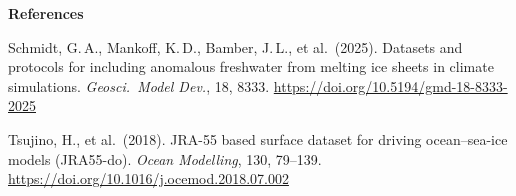 \documentclass{article}
\makeatletter
\def\pscale{2.12851}
\newlength\ph \setlength\ph{558.447mm}\setlength\ph{\pscale\ph}
\newcommand\tl[1]{\dimexpr\pscale\dimexpr#1mm\relax\relax} %
\newcommand\setfs[2]{%
  \edef\@fsa{\strip@pt\dimexpr\pscale\dimexpr#1pt\relax\relax}%
  \edef\@fsb{\strip@pt\dimexpr\pscale\dimexpr#2pt\relax\relax}%
  \fontsize{\@fsa}{\@fsb}\selectfont
  \spaceskip=0pt \xspaceskip=0pt}%
\newlength\colw  \setlength\colw{\tl{111.87}}
\newlength\colgap \setlength\colgap{\tl{10}}
\makeatother
\begin{document}
\begin{minipage}[t]{\colw}
\vspace{\tl{4}}
{\setfs{10}{12}\color{black!70}\textbf{References}\par\vspace{\tl{1}}
Schmidt, G.\,A., Mankoff, K.\,D., Bamber, J.\,L., et al.\ (2025). Datasets and
protocols for including anomalous freshwater from melting ice sheets in climate
simulations. \emph{Geosci.\ Model Dev.}, 18, 8333.
\url{https://doi.org/10.5194/gmd-18-8333-2025}\par\vspace{\tl{1}}
Tsujino, H., et al.\ (2018). JRA-55 based surface dataset for driving
ocean--sea-ice models (JRA55-do). \emph{Ocean Modelling}, 130, 79--139.
\url{https://doi.org/10.1016/j.ocemod.2018.07.002}\par}
\end{minipage}\hspace{\colgap}%
\end{document}
